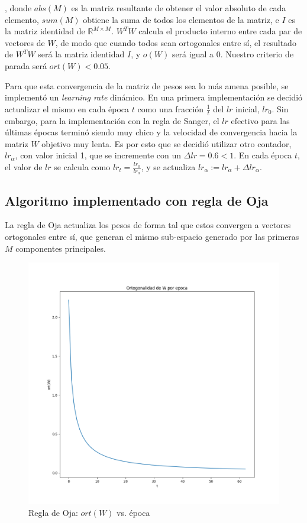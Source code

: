 \documentclass[a4paper,10pt]{article}
\begin{document}
, donde $abs(M)$ es la matriz resultante de obtener el valor absoluto de cada
elemento, $sum(M)$ obtiene la suma de todos los elementos de la matriz, e $I$
es la matriz identidad de $\mathbb{R}^{M \times M}$. $W^TW$ calcula el producto interno
entre cada par de vectores de $W$, de modo que cuando todos sean ortogonales
entre sí, el resultado de $W^TW$ será la matriz identidad $I$, y $o(W)$ será
igual a 0. Nuestro criterio de parada será $ort(W) < 0.05$.

Para que esta convergencia de la matriz de pesos sea lo más amena posible, se
implementó un \textit{learning rate} dinámico. En una primera implementación
se decidió actualizar el mismo en cada época $t$ como una fracción $\tfrac{1}{t}$ del $lr$
inicial, $lr_0$. Sin embargo, para la implementación con la regla de Sanger, el $lr$
efectivo para las últimas épocas terminó siendo muy chico y la velocidad de
convergencia hacia la matriz $W$ objetivo muy lenta. Es por esto que se
decidió utilizar otro contador, $lr_\alpha$, con valor inicial 1, que
se incremente con un $\Delta lr = 0.6 < 1$. En cada época $t$, el valor de $lr$ se
calcula como $lr_t = \tfrac{lr_0 }{lr_\alpha}$, y se actualiza $lr_\alpha := lr_\alpha
+ \Delta lr_\alpha$.

\subsection{Algoritmo implementado con regla de Oja}

La regla de Oja actualiza los pesos de forma tal que estos convergen a
vectores ortogonales entre sí, que generan el mismo sub-espacio generado por
las primeras $M$ componentes principales.

\begin{figure}[H]
	\centering
	\includegraphics[width=.7\textwidth]{imgs/oja-ortw_vs_epocas.png}
	\caption{Regla de Oja: $ort(W)$ vs. época}
	\label{fig:oja-ortw_vs_epocas}
\end{figure}
\end{document}
